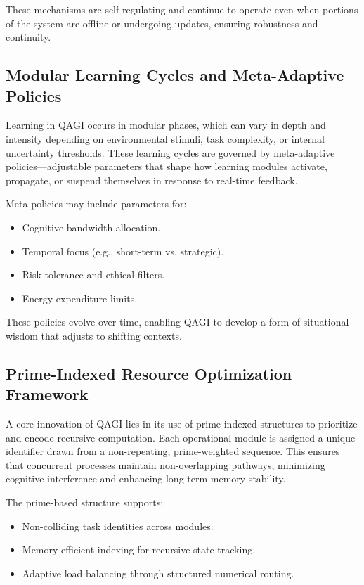 \documentclass{article}
\theoremstyle{plain}
\theoremstyle{claimstyle}
\begin{document}
These mechanisms are self-regulating and continue to operate even when portions of the system are offline or undergoing updates, ensuring robustness and continuity.

\subsection{Modular Learning Cycles and Meta-Adaptive Policies}

Learning in QAGI occurs in modular phases, which can vary in depth and intensity depending on environmental stimuli, task complexity, or internal uncertainty thresholds. These learning cycles are governed by meta-adaptive policies—adjustable parameters that shape how learning modules activate, propagate, or suspend themselves in response to real-time feedback.

Meta-policies may include parameters for:
\begin{itemize}
    \item Cognitive bandwidth allocation.
    \item Temporal focus (e.g., short-term vs. strategic).
    \item Risk tolerance and ethical filters.
    \item Energy expenditure limits.
\end{itemize}

These policies evolve over time, enabling QAGI to develop a form of situational wisdom that adjusts to shifting contexts.

\subsection{Prime-Indexed Resource Optimization Framework}

A core innovation of QAGI lies in its use of prime-indexed structures to prioritize and encode recursive computation. Each operational module is assigned a unique identifier drawn from a non-repeating, prime-weighted sequence. This ensures that concurrent processes maintain non-overlapping pathways, minimizing cognitive interference and enhancing long-term memory stability.

The prime-based structure supports:
\begin{itemize}
    \item Non-colliding task identities across modules.
    \item Memory-efficient indexing for recursive state tracking.
    \item Adaptive load balancing through structured numerical routing.
\end{itemize}
\end{document}
